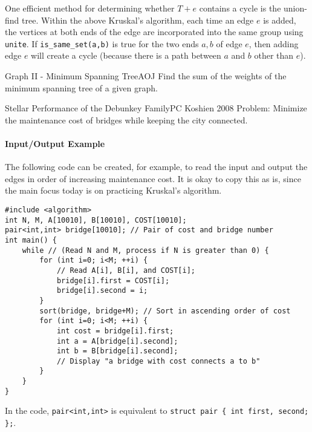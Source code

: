 One efficient method for determining whether $T+e$ contains a cycle is the union-find tree.
Within the above Kruskal's algorithm, each time an edge $e$ is added, the vertices at both ends of the edge are incorporated into the same group using \texttt{unite}.
If \texttt{is\_same\_set(a,b)} is true for the two ends $a,b$ of edge $e$, then adding edge $e$ will create a cycle (because there is a path between $a$ and $b$ other than $e$).

\begin{psbox}{Graph II - Minimum Spanning Tree}{AOJ}
Find the sum of the weights of the minimum spanning tree of a given graph.

\end{psbox}

\begin{pbox}{Stellar Performance of the Debunkey Family}{PC Koshien 2008}
Problem: Minimize the maintenance cost of bridges while keeping the city connected.

\end{pbox}

\paragraph{Input/Output Example}
The following code can be created, for example, to read the input and output the edges in order of increasing maintenance cost. It is okay to copy this as is, since the main focus today is on practicing Kruskal's algorithm.

\begin{cbox}
\begin{verbatim}
#include <algorithm>
int N, M, A[10010], B[10010], COST[10010];
pair<int,int> bridge[10010]; // Pair of cost and bridge number
int main() {
    while // (Read N and M, process if N is greater than 0) {
        for (int i=0; i<M; ++i) {
            // Read A[i], B[i], and COST[i];
            bridge[i].first = COST[i];
            bridge[i].second = i;
        }
        sort(bridge, bridge+M); // Sort in ascending order of cost
        for (int i=0; i<M; ++i) {
            int cost = bridge[i].first;
            int a = A[bridge[i].second];
            int b = B[bridge[i].second];
            // Display "a bridge with cost connects a to b"
        }
    }
}
\end{verbatim}
\end{cbox}

In the code, \texttt{pair<int,int>} is equivalent to \texttt{struct pair \{ int first, second; \};}.

